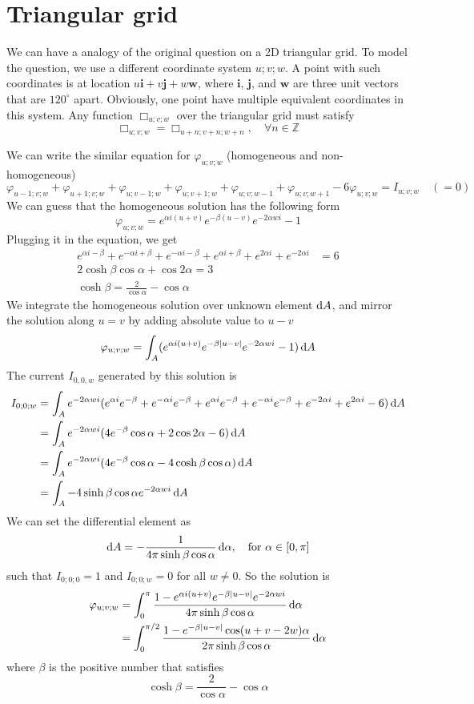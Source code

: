 \documentclass[10pt,a4paper,draft]{article}
\begin{document}
\section{Triangular grid}

We can have a analogy of the original question on a 2D triangular grid. To model the question, we use a different coordinate system $u;v;w$. A point with such coordinates is at location $u\mathbf{i}+v\mathbf{j}+w\mathbf{w}$, where $\mathbf{i}$, $\mathbf{j}$, and $\mathbf{w}$ are three unit vectors that are $120^{\circ}$ apart. Obviously, one point have multiple equivalent coordinates in this system. Any function $\Box_{u;v;w}$ over the triangular grid must satisfy
\[
\Box_{u;v;w} = \Box_{u+n;v+n;w+n},\quad\forall n \in \mathbb{Z}
\]

We can write the similar equation for $\varphi_{u;v;w}$ (homogeneous and non-homogeneous)
\[
\varphi_{u-1;v;w} + \varphi_{u+1;v;w} + \varphi_{u;v-1;w} + \varphi_{u;v+1;w} + \varphi_{u;v;w-1}+ \varphi_{u;v;w+1} - 6\varphi_{u;v;w} = I_{u;v;w}\quad(=0)
\]
We can guess that the homogeneous solution has the following form
\[
\varphi_{u;v;w} = e^{\alpha i(u+v)}e^{-\beta(u-v)}e^{-2\alpha w i}-1
\]
Plugging it in the equation, we get
\begin{align*}
e^{\alpha i -\beta} + e^{-\alpha i +\beta}+e^{-\alpha i -\beta}+e^{\alpha i +\beta}+e^{2\alpha i}+e^{-2\alpha i}&= 6\\
2\cosh\beta\cos\alpha + \cos 2\alpha = 3\\
\cosh\beta= \frac{2}{\cos\alpha}-\cos\alpha
\end{align*}
We integrate the homogeneous solution over unknown element $\mathrm{d} A$, and mirror the solution along $u=v$ by adding absolute value to $u-v$
\[
\varphi_{u;v;w} = \int_A(e^{\alpha i(u+v)}e^{-\beta|u-v|}e^{-2\alpha w i}-1) \,\mathrm{d} A
\]
The current $I_{0,0,w}$ generated by this solution is
\begin{align*}
I_{0;0;w} &=  \int_A e^{-2\alpha w i}(e^{\alpha i}e^{-\beta}+e^{-\alpha i}e^{-\beta}+e^{\alpha i}e^{-\beta}+e^{-\alpha i}e^{-\beta}+e^{-2\alpha i}+e^{2\alpha i}-6) \,\mathrm{d} A\\
&= \int_A e^{-2\alpha w i}(4 e^{-\beta}\cos\alpha+2\cos2\alpha-6) \,\mathrm{d} A\\
&= \int_A e^{-2\alpha w i}(4 e^{-\beta}\cos\alpha-4 \cosh\beta\cos\alpha) \,\mathrm{d} A\\
&= \int_A -4 \sinh\beta\cos\alpha e^{-2\alpha w i} \,\mathrm{d} A
\end{align*}
We can set the differential element as 
\[
\mathrm{d} A = -\frac{1}{4\pi \sinh\beta\cos\alpha}\,\mathrm{d}\alpha,\quad \mbox{for } \alpha\in[0, \pi]
\]
such that $I_{0;0;0} = 1$ and $I_{0;0;w} = 0$ for all $w\neq0$. So the solution is
\begin{align*}
\varphi_{u;v;w} &= \int_0^{\pi}\frac{1-e^{\alpha i(u+v)}e^{-\beta|u-v|}e^{-2\alpha w i}}{4\pi \sinh\beta\cos\alpha} \,\mathrm{d}\alpha\\
&= \int_0^{\pi/2}\frac{1-e^{-\beta|u-v|}\cos(u+v-2w)\alpha}{2\pi \sinh\beta\cos\alpha} \,\mathrm{d}\alpha
\end{align*}
where $\beta$ is the positive number that satisfies
\[
\cosh\beta= \frac{2}{\cos\alpha}-\cos\alpha
\]
\end{document}
